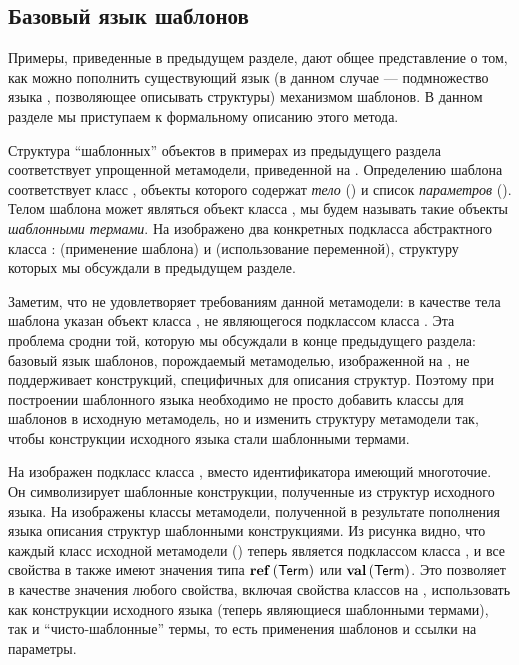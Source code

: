 \subsection{Базовый язык шаблонов}

Примеры, приведенные в предыдущем разделе, дают общее представление о том, как можно пополнить существующий язык (в данном случае --- подмножество языка , позволяющее описывать структуры) механизмом шаблонов. В данном разделе мы приступаем к формальному описанию этого метода.

Структура ``шаблонных'' объектов в примерах из предыдущего раздела соответствует упрощенной метамодели, приведенной на .
%
%
Определению шаблона соответствует класс , объекты которого содержат \emph{тело} () и список \emph{параметров} (). Телом шаблона может являться объект класса , мы будем называть такие объекты \emph{шаблонными термами}. На  изображено два конкретных подкласса абстрактного класса :  (применение шаблона) и  (использование переменной), структуру которых мы обсуждали в предыдущем разделе. 

Заметим, что  не удовлетворяет требованиям данной метамодели: в качестве тела шаблона указан объект класса , не являющегося подклассом класса . Эта проблема сродни той, которую мы обсуждали в конце предыдущего раздела: базовый язык шаблонов, порождаемый метамоделью, изображенной на , не поддерживает конструкций, специфичных для описания структур. Поэтому при построении шаблонного языка необходимо не просто добавить классы для шаблонов в исходную метамодель, но и изменить структуру метамодели так, чтобы конструкции исходного языка стали шаблонными термами. 

На  изображен подкласс класса , вместо идентификатора имеющий многоточие. Он символизирует шаблонные конструкции, полученные из структур исходного языка. На  изображены классы метамодели, полученной в результате пополнения языка описания структур шаблонными конструкциями.
%
%
Из рисунка видно, что каждый класс исходной метамодели () теперь является подклассом класса , и все свойства в также имеют значения типа $\mathbf{ref}\left(\mathsf{Term}\right)$ или $\mathbf{val}\left(\mathsf{Term}\right)$. Это позволяет в качестве значения любого свойства, включая свойства классов на , использовать как конструкции исходного языка (теперь являющиеся шаблонными термами), так и ``чисто-шаблонные'' термы, то есть применения шаблонов и ссылки на параметры.

